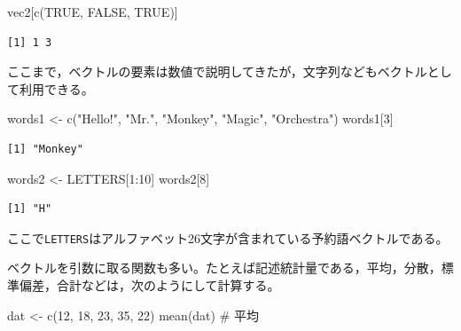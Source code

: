 \documentclass[
  a4paper,
]{ltjsbook}
\newenvironment{Shaded}{\begin{snugshade}}{\end{snugshade}}
\newcommand{\CommentTok}[1]{\textcolor[rgb]{0.37,0.37,0.37}{#1}}
\newcommand{\ConstantTok}[1]{\textcolor[rgb]{0.56,0.35,0.01}{#1}}
\newcommand{\DecValTok}[1]{\textcolor[rgb]{0.68,0.00,0.00}{#1}}
\newcommand{\FunctionTok}[1]{\textcolor[rgb]{0.28,0.35,0.67}{#1}}
\newcommand{\NormalTok}[1]{\textcolor[rgb]{0.00,0.23,0.31}{#1}}
\newcommand{\OtherTok}[1]{\textcolor[rgb]{0.00,0.23,0.31}{#1}}
\newcommand{\SpecialCharTok}[1]{\textcolor[rgb]{0.37,0.37,0.37}{#1}}
\newcommand{\StringTok}[1]{\textcolor[rgb]{0.13,0.47,0.30}{#1}}
\begin{document}
\begin{Shaded}
\begin{Highlighting}[]
\NormalTok{vec2[}\FunctionTok{c}\NormalTok{(}\ConstantTok{TRUE}\NormalTok{, }\ConstantTok{FALSE}\NormalTok{, }\ConstantTok{TRUE}\NormalTok{)]}
\end{Highlighting}
\end{Shaded}

\begin{verbatim}
[1] 1 3
\end{verbatim}

ここまで，ベクトルの要素は数値で説明してきたが，文字列などもベクトルとして利用できる。

\begin{Shaded}
\begin{Highlighting}[]
\NormalTok{words1 }\OtherTok{\textless{}{-}} \FunctionTok{c}\NormalTok{(}\StringTok{"Hello!"}\NormalTok{, }\StringTok{"Mr."}\NormalTok{, }\StringTok{"Monkey"}\NormalTok{, }\StringTok{"Magic"}\NormalTok{, }\StringTok{"Orchestra"}\NormalTok{)}
\NormalTok{words1[}\DecValTok{3}\NormalTok{]}
\end{Highlighting}
\end{Shaded}

\begin{verbatim}
[1] "Monkey"
\end{verbatim}

\begin{Shaded}
\begin{Highlighting}[]
\NormalTok{words2 }\OtherTok{\textless{}{-}}\NormalTok{ LETTERS[}\DecValTok{1}\SpecialCharTok{:}\DecValTok{10}\NormalTok{]}
\NormalTok{words2[}\DecValTok{8}\NormalTok{]}
\end{Highlighting}
\end{Shaded}

\begin{verbatim}
[1] "H"
\end{verbatim}

ここで\texttt{LETTERS}はアルファベット26文字が含まれている予約語ベクトルである。

ベクトルを引数に取る関数も多い。たとえば記述統計量である，平均，分散，標準偏差，合計などは，次のようにして計算する。

\begin{Shaded}
\begin{Highlighting}[]
\NormalTok{dat }\OtherTok{\textless{}{-}} \FunctionTok{c}\NormalTok{(}\DecValTok{12}\NormalTok{, }\DecValTok{18}\NormalTok{, }\DecValTok{23}\NormalTok{, }\DecValTok{35}\NormalTok{, }\DecValTok{22}\NormalTok{)}
\FunctionTok{mean}\NormalTok{(dat) }\CommentTok{\# 平均}
\end{Highlighting}
\end{Shaded}
\end{document}
